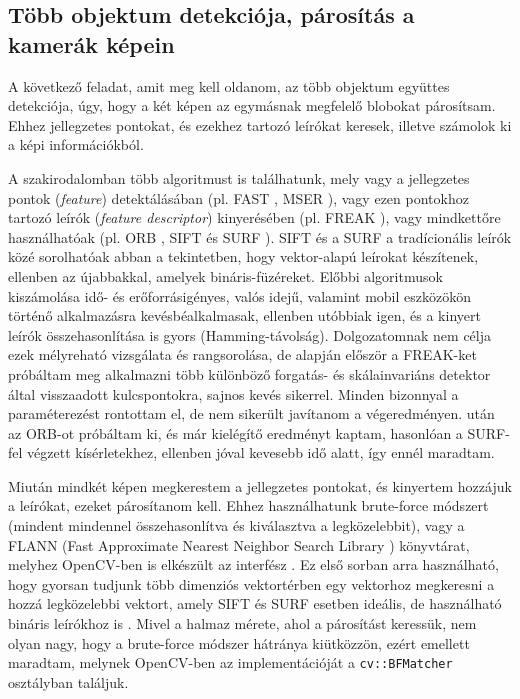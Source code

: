 \subsection{Több objektum detekciója, párosítás a kamerák képein}

A következő feladat, amit meg kell oldanom, az több objektum együttes detekciója, úgy, hogy a két képen az egymásnak megfelelő blobokat párosítsam. Ehhez jellegzetes pontokat, és ezekhez tartozó leírókat keresek, illetve számolok ki a képi információkból.

A szakirodalomban több algoritmust is találhatunk, mely vagy a jellegzetes pontok (\textit{feature}) detektálásában (pl. FAST \cite{FAST}, MSER \cite{MSER}), vagy ezen pontokhoz tartozó leírók (\textit{feature descriptor}) kinyerésében (pl. FREAK \cite{FREAK}), vagy mindkettőre használhatóak (pl. ORB \cite{ORB}, SIFT \cite{SIFT} és SURF \cite{SURF}). SIFT és a SURF a tradícionális leírók közé sorolhatóak abban a tekintetben, hogy vektor-alapú leírokat készítenek, ellenben az újabbakkal, amelyek bináris-füzéreket. Előbbi algoritmusok kiszámolása idő- és erőforrásigényes, valós idejű, valamint mobil eszközökön történő alkalmazásra kevésbéalkalmasak, ellenben utóbbiak igen, és a kinyert leírók összehasonlítása is gyors (Hamming-távolság). Dolgozatomnak nem célja ezek mélyreható vizsgálata és rangsorolása, de \cite{feature-detection-comparison} alapján először a FREAK-ket próbáltam meg alkalmazni több különböző forgatás- és skálainvariáns detektor által visszaadott kulcspontokra, sajnos kevés sikerrel. Minden bizonnyal a paraméterezést rontottam el, de nem sikerült javítanom a végeredményen. \cite{ORB} után az ORB-ot próbáltam ki, és már kielégítő eredményt kaptam, hasonlóan a SURF-fel végzett kísérletekhez, ellenben jóval kevesebb idő alatt, így ennél maradtam.

Miután mindkét képen megkerestem a jellegzetes pontokat, és kinyertem hozzájuk a leírókat, ezeket párosítanom kell. Ehhez használhatunk brute-force módszert (mindent mindennel összehasonlítva és kiválasztva a legközelebbit), vagy a FLANN (Fast Approximate Nearest Neighbor Search Library \cite{flann_pami_2014}) könyvtárat, melyhez OpenCV-ben is elkészült az interfész \cite{opencv-flann}. Ez első sorban arra használható, hogy gyorsan tudjunk több dimenziós vektortérben egy vektorhoz megkeresni a hozzá legközelebbi vektort, amely SIFT és SURF esetben ideális, de használható bináris leírókhoz is \cite{flann-binary}. Mivel a halmaz mérete, ahol a párosítást keressük, nem olyan nagy, hogy a brute-force módszer hátránya kiütközzön, ezért emellett maradtam, melynek OpenCV-ben az implementációját a \texttt{cv::BFMatcher} osztályban találjuk.

